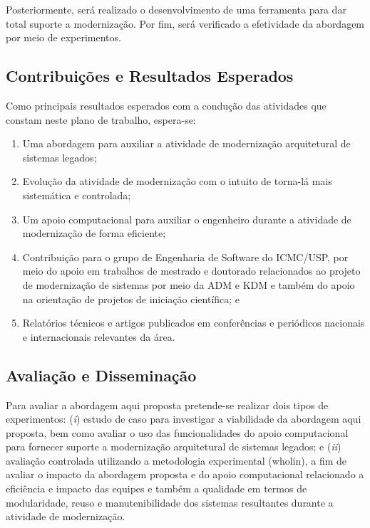 \documentclass[12pt]{article}
\begin{document}
Posteriormente, será realizado o desenvolvimento de uma ferramenta para dar total suporte a modernização. Por fim, será verificado a efetividade da abordagem por meio de experimentos. 

\subsection{Contribuições e Resultados Esperados}\label{sec:resultados_esperados}

Como principais resultados esperados com a condução das atividades que constam neste plano de trabalho, espera-se:

\begin{enumerate}
\item Uma abordagem para auxiliar a atividade de modernização arquitetural de sistemas legados;
\item Evolução da atividade de modernização com o intuito de torna-lá mais sistemática e controlada;
\item Um apoio computacional para auxiliar o engenheiro durante a atividade de modernização de forma eficiente;
\item Contribuição para o grupo de Engenharia de Software do ICMC/USP, por meio do apoio em trabalhos de mestrado e doutorado relacionados ao projeto de modernização de sistemas por meio da ADM e KDM e também do apoio na orientação de projetos de iniciação científica; e
\item Relatórios técnicos e artigos publicados em conferências e periódicos nacionais e internacionais relevantes da área.
\end{enumerate}

\subsection{Avaliação e Disseminação}

Para avaliar a abordagem aqui proposta pretende-se realizar dois tipos de experimentos: (\textit{i}) estudo de caso para investigar a viabilidade da abordagem aqui proposta, bem como avaliar o uso das funcionalidades do apoio computacional para fornecer suporte a modernização arquitetural de sistemas legados; e (\textit{ii}) avaliação controlada utilizando a metodologia experimental (wholin), a fim de avaliar o impacto da abordagem proposta e do apoio computacional relacionado a eficiência e impacto das equipes e também a qualidade em termos de modularidade, reuso e manutenibilidade dos sistemas resultantes durante a atividade de modernização.
\end{document}
